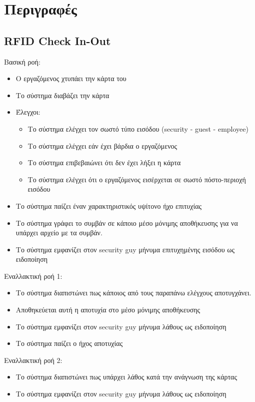 \documentclass{article}
\begin{document}
\section{Περιγραφές}

\subsection{RFID Check In-Out}

\noindent Βασική ροή:
\begin{itemize}
    \item Ο εργαζόμενος χτυπάει την κάρτα του
    \item Το σύστημα διαβάζει την κάρτα
    \item Έλεγχοι: 
    \begin{itemize}
        \item Το σύστημα ελέγχει τον σωστό τύπο εισόδου (security - guest - employee)
        \item Το σύστημα ελέγχει εάν έχει βάρδια ο εργαζόμενος
        \item Το σύστημα επιβεβαιώνει ότι δεν έχει λήξει η κάρτα 
        \item Το σύστημα ελέγχει ότι ο εργαζόμενος εισέρχεται σε σωστό πόστο-περιοχή εισόδου
    \end{itemize}
    \item Το σύστημα παίζει έναν χαρακτηριστικός υψίτονο ήχο επιτυχίας
    \item Το σύστημα γράφει το συμβάν σε κάποιο μέσο μόνιμης αποθήκευσης για να υπάρχει αρχείο με τα συμβάν.
    \item Το σύστημα εμφανίζει στον security guy μήνυμα επιτυχημένης εισόδου ως ειδοποίηση
\end{itemize}

\noindent Εναλλακτική ροή 1: 
\begin{itemize}
    \item Το σύστημα διαπιστώνει πως κάποιος από τους παραπάνω ελέγχους αποτυγχάνει.
    \item Αποθηκεύεται αυτή η αποτυχία στο μέσο μόνιμης αποθήκευσης
    \item Το σύστημα εμφανίζει στον security guy μήνυμα λάθους ως ειδοποίηση
    \item Το σύστημα παίζει ο ήχος αποτυχίας
\end{itemize}

\noindent Εναλλακτική ροή 2: 
\begin{itemize}
    \item Το σύστημα διαπιστώνει πως υπάρχει λάθος κατά την ανάγνωση της κάρτας
    \item Το σύστημα εμφανίζει στον security guy μήνυμα λάθους ως ειδοποίηση
\end{itemize}
\end{document}
